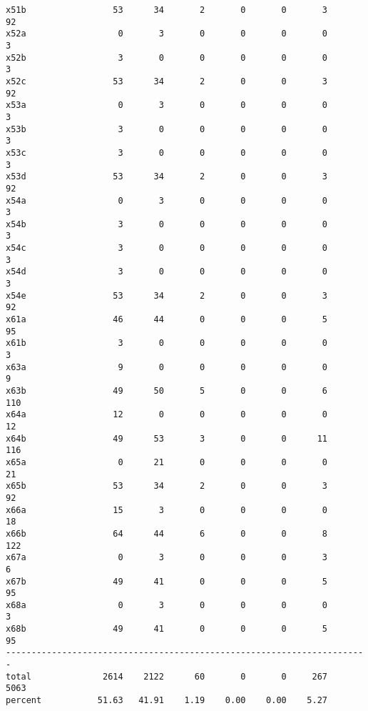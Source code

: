 \documentclass[11pt]{article}
\begin{document}
\begin{small}
\begin{verbatim}
x51b                 53      34       2       0       0       3      92
x52a                  0       3       0       0       0       0       3
x52b                  3       0       0       0       0       0       3
x52c                 53      34       2       0       0       3      92
x53a                  0       3       0       0       0       0       3
x53b                  3       0       0       0       0       0       3
x53c                  3       0       0       0       0       0       3
x53d                 53      34       2       0       0       3      92
x54a                  0       3       0       0       0       0       3
x54b                  3       0       0       0       0       0       3
x54c                  3       0       0       0       0       0       3
x54d                  3       0       0       0       0       0       3
x54e                 53      34       2       0       0       3      92
x61a                 46      44       0       0       0       5      95
x61b                  3       0       0       0       0       0       3
x63a                  9       0       0       0       0       0       9
x63b                 49      50       5       0       0       6     110
x64a                 12       0       0       0       0       0      12
x64b                 49      53       3       0       0      11     116
x65a                  0      21       0       0       0       0      21
x65b                 53      34       2       0       0       3      92
x66a                 15       3       0       0       0       0      18
x66b                 64      44       6       0       0       8     122
x67a                  0       3       0       0       0       3       6
x67b                 49      41       0       0       0       5      95
x68a                  0       3       0       0       0       0       3
x68b                 49      41       0       0       0       5      95
-----------------------------------------------------------------------
total              2614    2122      60       0       0     267    5063
percent           51.63   41.91    1.19    0.00    0.00    5.27


\end{verbatim}
\end{small}
\end{document}
